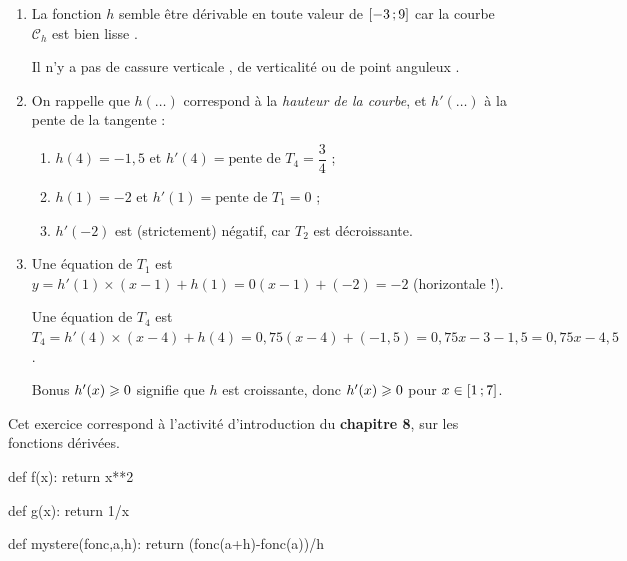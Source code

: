 \documentclass[a4paper,11pt]{article}
\begin{document}
\medskip


\begin{enumerate}
	\item La fonction $h$ semble être dérivable en toute valeur de $\mbox{\ensuremath{\left[-3\mathpunct{};9\right]}}$ car la courbe $\mathscr{C}_h$ est \og bien lisse \fg{}.
	
	Il n'y a pas de \og cassure verticale \fg, de \og verticalité \fg{} ou de \og point anguleux \fg.
	\item On rappelle que $h(\ldots)$ correspond à la \textit{hauteur de la courbe}, et $h'(\ldots)$ à la pente de la tangente :
	\begin{enumerate}
		\item $h(4)=-1,5$ et $h'(4)=\text{pente de }T_4=\dfrac{3}{4}$ ;
		\item $h(1)=-2$ et $h'(1)=\text{pente de }T_1=0$ ;
		\item $h'(-2)$ est (strictement) négatif, car $T_2$ est décroissante.
	\end{enumerate}
	\item Une équation de $T_1$ est $y=h'(1) \times (x-1) + h(1) = 0(x-1) + (-2) = -2$ (horizontale !).
	
	Une équation de $T_4$ est $T_4 = h'(4) \times (x-4) + h(4) = 0,75(x-4)+(-1,5) = 0,75x-3-1,5=0,75x-4,5$.
	\item[Bonus] $h'(x) \geqslant 0$ signifie que $h$ est croissante, donc $h'(x) \geqslant 0$ pour $x \in \mbox{\ensuremath{\left[1\mathpunct{};7\right]}}$.
\end{enumerate}

\newpage


\medskip

Cet exercice correspond à l'\textsf{activité d'introduction} du \textbf{chapitre 8}, sur les fonctions dérivées.

\medskip


\medskip

\begin{pyconcode}
def f(x):
	return x**2

def g(x):
	return 1/x

def mystere(fonc,a,h):
	return (fonc(a+h)-fonc(a))/h

\end{pyconcode}
\end{document}
